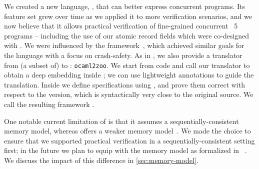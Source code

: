 We created a new \Iris language, \ZooLang, that can better express concurrent \OCaml programs. Its feature set grew over time as we applied it to more verification scenarios, and we now believe that it allows practical verification of fine-grained concurrent \OCaml~5 programs -- including the use of our atomic record fields which were co-designed with \ZooLang.
We were influenced by the \Perennial framework~\citep*{DBLP:conf/sosp/ChajedTKZ19}, which achieved similar goals for the \Go language with a focus on crash-safety.
As in \Perennial, we also provide a translator from (a subset of) \OCaml to \ZooLang: \texttt{ocaml2zoo}. We start from \OCaml code and call our translator to obtain a deep \ZooLang embedding inside \Rocq; we can use lightweight annotations to guide the translation. Inside \Rocq we define specifications using \Iris, and prove them correct with respect to the \ZooLang version, which is syntactically very close to the original \OCaml source.
We call the resulting framework \Zoo.

One notable current limitation of \ZooLang is that it assumes a sequentially-consistent memory model, whereas \OCaml offers a weaker memory model~\citep*{ocaml-memory-model}. We made the choice to ensure that we supported practical verification in a sequentially-consistent setting first; in the future we plan to equip \ZooLang with the \OCaml memory model as formalized in \Cosmo~\citep*{DBLP:journals/pacmpl/MevelJP20}. We discuss the impact of this difference in \cref{sec:memory-model}.


